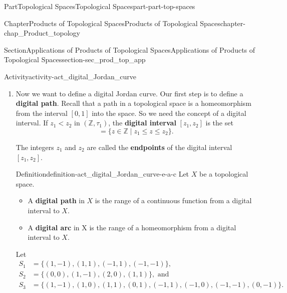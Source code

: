 \documentclass[oneside,10pt,]{book}
\newcommand{\terminology}[1]{\textbf{#1}}
\newcommand{\pubtitle}[1]{\textsl{#1}}
\numberwithin{equation}{chapter}
\newcommand{\Z}{\mathbb{Z}}
\newcommand{\lt}{<}
\newcommand{\amp}{&}
\begin{document}
\begin{partptx}{Part}{Topological Spaces}{}{Topological Spaces}{}{}{part-part-top-spaces}
\begin{chapterptx}{Chapter}{Products of Topological Spaces}{}{Products of Topological Spaces}{}{}{chapter-chap_Product_topology}
\begin{sectionptx}{Section}{Applications of Products of Topological Spaces}{}{Applications of Products of Topological Spaces}{}{}{section-sec_prod_top_app}
\begin{activity}{Activity}{}{activity-act_digital_Jordan_curve}
\begin{enumerate}[font=\bfseries,label=(\alph*),ref=\alph*]
\begin{equation*}
B(m,n) = \begin{cases}\{(m,n)\}  \amp  m \text{ and }  n \text{ odd, }  \\ \{(m-i,n-j) \mid -1 \leq i \leq 1, -1 \leq j \leq 1\} \amp m \text{ and }  n \text{ even, }  \\ \{(m,n-1), (m,n), (m,n+1)\} \amp m \text{ odd and }  n \text{ even, }  \\ \{(m-1,n), (m,n), (m+1,n)\} \amp m \text{ even and }  n \text{ odd } \end{cases}
\end{equation*}
is a basis for the Khalimsky topology \(\tau_2\) on \(\Z^2\). (This topology was originally published by E. Khalimsky in \pubtitle{Applications of connected ordered topological spaces in topology}, Conference of math. departments of Povolsia, 1970.)%
\item{}Now we want to define a digital Jordan curve. Our first step is to define a \terminology{digital path}. Recall that a path in a topological space is a homeomorphism from the interval \([0,1]\) into the space. So we need the concept of a digital interval. If \(z_1 \lt  z_2\) in \((\Z, \tau_1)\), the \terminology{digital interval} \([z_1,z_2]\) is the set%
\begin{equation*}
[z_1, z_2] = \{z \in \Z \mid z_1 \leq z \leq z_2\}\text{.}
\end{equation*}
%
\par
The integers \(z_1\) and \(z_2\) are called the \terminology{endpoints} of the digital interval \([z_1,z_2]\).%
\begin{definition}{Definition}{}{definition-act_digital_Jordan_curve-e-a-c}%
%
%
Let \(X\) be a topological space.%
\begin{itemize}[label=\textbullet]
\item{}A \terminology{digital path} in \(X\) is the range of a continuous function from a digital interval to \(X\).%
\item{}A \terminology{digital arc} in X is the range of a homeomorphism from a digital interval to \(X\).%
\end{itemize}
%
\end{definition}
Let%
\begin{align*}
S_1 \amp = \{(1,-1), (1,1), (-1,1), (-1,-1)\},\\
S_2 \amp = \{(0,0), (1,-1), (2,0), (1,1)\}, \text{ and }\\
S_3 \amp = \{(1,-1), (1,0), (1,1), (0,1), (-1,1), (-1,0), (-1,-1), (0,-1)\}\text{.}
\end{align*}

\end{enumerate}
\end{activity}
\end{sectionptx}
\end{chapterptx}
\end{partptx}
\end{document}
